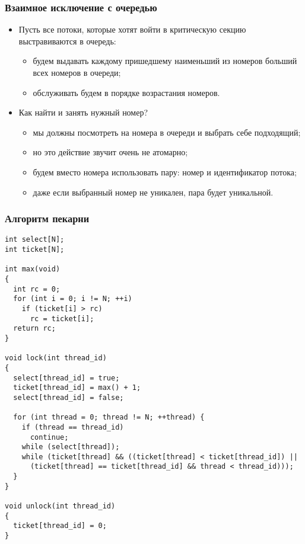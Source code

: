\begin{frame}
\frametitle{Взаимное исключение с очередью}
\begin{itemize}
  \item Пусть все потоки, которые хотят войти в критическую секцию
  выстравиваются в очередь:
  \begin{itemize}
    \item будем выдавать каждому пришедшему наименьший из номеров больший
    всех номеров в очереди;
    \item обслуживать будем в порядке возрастания номеров.
  \end{itemize}
  \item Как найти и занять нужный номер?
  \begin{itemize}
    \item мы должны посмотреть на номера в очереди и выбрать себе подходящий;
    \item но это действие звучит очень не атомарно;
    \item будем вместо номера использовать пару: номер и идентификатор потока;
    \item даже если выбранный номер не уникален, пара будет уникальной.
  \end{itemize}
\end{itemize}
\end{frame}

\begin{frame}[fragile]
\frametitle{Алгоритм пекарни}
\begin{lstlisting}
int select[N];
int ticket[N];

int max(void)
{
  int rc = 0;
  for (int i = 0; i != N; ++i)
    if (ticket[i] > rc)
      rc = ticket[i];
  return rc;
}

void lock(int thread_id)
{
  select[thread_id] = true;
  ticket[thread_id] = max() + 1;
  select[thread_id] = false;

  for (int thread = 0; thread != N; ++thread) {
    if (thread == thread_id)
      continue;
    while (select[thread]);
    while (ticket[thread] && ((ticket[thread] < ticket[thread_id]) ||
      (ticket[thread] == ticket[thread_id] && thread < thread_id)));
  }
}

void unlock(int thread_id)
{
  ticket[thread_id] = 0;
}
\end{lstlisting}
\end{frame}

